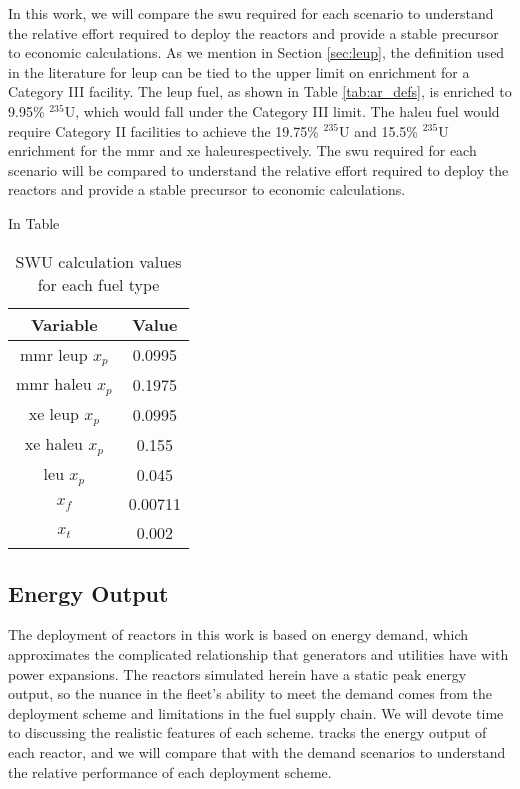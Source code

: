 In this work, we will compare the \gls{swu} required for each scenario to understand the relative effort required to deploy the reactors and provide a stable precursor to economic calculations. As we mention in Section \ref{sec:leup}, the definition used in the literature for \gls{leup} can be tied to the upper limit on enrichment for a Category III facility. The \gls{leup} fuel, as shown in Table \ref{tab:ar_defs}, is enriched to 9.95\% $^{235}$U, which would fall under the Category III limit. The \gls{haleu} fuel would require Category II facilities to achieve the 19.75\% $^{235}$U and 15.5\% $^{235}$U enrichment for the \gls{mmr} and \gls{xe} \gls{haleu}respectively. The \gls{swu} required for each scenario will be compared to understand the relative effort required to deploy the reactors and provide a stable precursor to economic calculations.

In Table

\begin{table}
    \centering
    \caption{SWU calculation values for each fuel type}
    \label{tab:swu_vals}
    \begin{tabular}{c c}
        \hline
        \textbf{Variable} & \textbf{Value}\\
        \hline
        \gls{mmr} \gls{leup} $x_p$ & 0.0995\\
        \gls{mmr} \gls{haleu} $x_p$ & 0.1975\\
        \gls{xe} \gls{leup} $x_p$ & 0.0995\\
        \gls{xe} \gls{haleu} $x_p$ & 0.155\\
        \gls{leu} $x_p$ & 0.045\\
        $x_f$ & 0.00711\\
        $x_t$ & 0.002\\
        \hline
    \end{tabular}
\end{table}

\subsection{Energy Output}
\label{sec:energy_output}

The deployment of reactors in this work is based on energy demand, which
approximates the complicated relationship that generators and utilities
have with power expansions. The reactors simulated herein have a static peak energy output, so the nuance in the fleet's ability to meet the demand comes from the deployment scheme and limitations in the fuel supply chain. We will devote time to discussing the realistic features of each scheme. \cyclus tracks the energy output of each reactor, and we will compare that with the demand scenarios to understand the relative performance of each deployment scheme.


